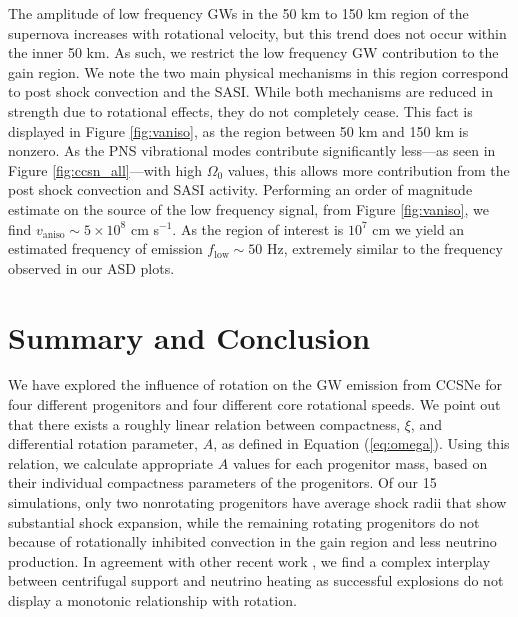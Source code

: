 \documentclass[twocolumn,times]{aastex62}  %
\begin{document}
The amplitude of low frequency GWs in the 50 km to 150 km region of the supernova increases with rotational velocity, but this trend does not occur within the inner 50 km.  As such, we restrict the low frequency GW contribution to the gain region.  We note the two main physical mechanisms in this region correspond to post shock convection and the SASI.  While both mechanisms are reduced in strength due to rotational effects, they do not completely cease.  This fact is displayed in Figure \ref{fig:vaniso}, as the region between 50 km and 150 km is nonzero.  As the PNS vibrational modes contribute significantly less---as seen in Figure \ref{fig:ccsn_all}---with high $\Omega_0$ values, this allows more contribution from the post shock convection and SASI activity.  Performing an order of magnitude estimate on the source of the low frequency signal, from Figure \ref{fig:vaniso}, we find $v_{\mathrm{aniso}} \sim 5 \times 10^8$ cm s$^{-1}$.  As the region of interest is $10^7$ cm we yield an estimated frequency of emission $f_{\mathrm{low}} \sim 50$ Hz, extremely similar to the frequency observed in our ASD plots.




\section{Summary and Conclusion}
\label{sec:summary}

We have explored the influence of rotation on the GW emission from CCSNe for four different progenitors and four different core rotational speeds.  
We point out that there exists a roughly linear relation between compactness, $\xi$, and differential rotation parameter, $A$, as defined in Equation (\ref{eq:omega}). 
Using this relation, we calculate appropriate $A$ values for each progenitor mass, based on their individual compactness parameters of the \citet{Suk:2016} progenitors.  Of our 15 simulations, only two nonrotating progenitors have average shock radii that show substantial shock expansion, while the remaining rotating progenitors do not because of rotationally inhibited convection in the gain region and less neutrino production.  In agreement with other recent work \citep[e.g.,][]{summa:2018}, we find a complex interplay between centrifugal support and neutrino heating as successful explosions do not display a monotonic relationship with rotation.
\end{document}
